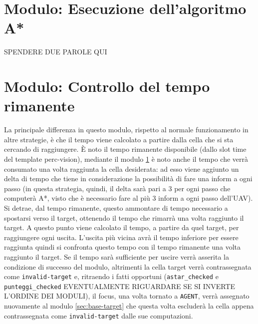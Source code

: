 \section{Modulo: Esecuzione dell'algoritmo A*} \label{sec:base-astar}
{\color{red}SPENDERE DUE PAROLE QUI}

\section{Modulo: Controllo del tempo rimanente} \label{sec:base-tempo}
La principale differenza in questo modulo, rispetto al normale funzionamento in altre strategie, è che il tempo viene calcolato a partire dalla cella che si sta cercando di raggiungere. È noto il tempo rimanente disponibile (dallo slot time del template perc-vision), mediante il modulo \ref{sec:base-astar} è noto anche il tempo che verrà consumato una volta raggiunta la cella desiderata: ad esso viene aggiunto un delta di tempo che tiene in considerazione la possibilità di fare una inform a ogni passo (in questa strategia, quindi, il delta sarà pari a 3 per ogni passo che computerà A*, visto che è necessario fare al più 3 inform a ogni passo dell'UAV). Si detrae, dal tempo rimanente, questo ammontare di tempo necessario a spostarsi verso il target, ottenendo il tempo che rimarrà una volta raggiunto il target. A questo punto viene calcolato il tempo, a partire da quel target, per raggiungere ogni uscita. L'uscita più vicina avrà il tempo inferiore per essere raggiunta quindi si confronta questo tempo con il tempo rimanente una volta raggiunto il target. Se il tempo sarà sufficiente per uscire verrà asserita la condizione di successo del modulo, altrimenti la cella target verrà contrassegnata come \texttt{invalid-target} e, ritraendo i fatti opportuni (\texttt{astar\_checked} e \texttt{punteggi\_checked} {\color{red} EVENTUALMENTE RIGUARDARE SE SI INVERTE L'ORDINE DEI MODULI}), il focus, una volta tornato a \texttt{AGENT}, verrà assegnato nuovamente al modulo \ref{sec:base-target} che questa volta escluderà la cella appena contrassegnata come \texttt{invalid-target} dalle sue computazioni.

